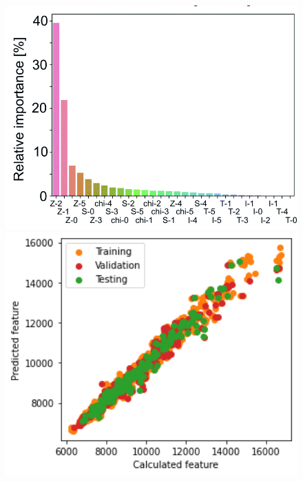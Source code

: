 \begin{figure}[h]
      \includegraphics[width=1.0\textwidth]{figures/regression/fourier/importance_map.png}
    \endminipage\hfill
      \includegraphics[width=1.0\textwidth]{figures/regression/fourier/transfer/scatterZ2.png}
    \endminipage

\end{figure}
